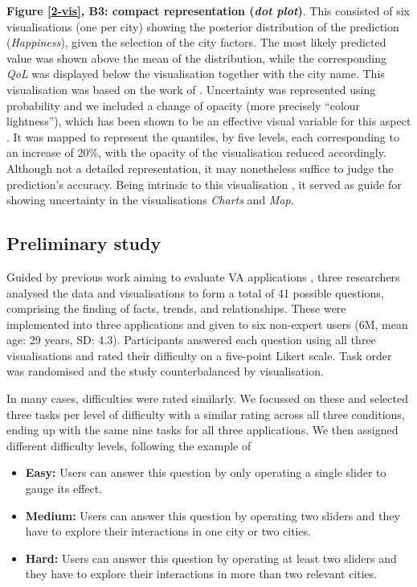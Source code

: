 \documentclass[final,5p,times,twocolumn,authoryear]{elsarticle}
\newcommand{\q}[1]{``#1''}
\begin{document}
\noindent \textbf{Figure  \ref{2-vis}, B3: compact representation (\emph{dot plot})}. This consisted of six visualisations (one per city) showing the posterior distribution of the prediction (\emph{Happiness}), given the selection of the city factors. The most likely predicted value was shown above the mean of the distribution, while the corresponding \emph{QoL} was displayed below the visualisation together with the city name. This visualisation was based on the work of  \cite{kay_when_2016}. Uncertainty was represented using probability and we included a change of opacity (more precisely \q{colour lightness}), which has been shown to be an effective visual variable for this aspect \citep{davis_modelling_1997}. It was mapped to represent the quantiles, by five levels, each corresponding to an increase of 20\%, with the opacity of the visualisation reduced accordingly. Although not a detailed representation, it may nonetheless suffice to judge the prediction's accuracy. Being intrinsic to this visualisation \citep{kay_when_2016}, it served as guide for showing uncertainty in the visualisations \emph{Charts} and \emph{Map}.




\subsection{Preliminary study} %
\label{sec:preliminary_study}
Guided by previous work aiming to evaluate VA applications \citep{laskowski_framework_2007,hearst_evaluating_2016}, three researchers analysed the data and visualisations to form a total of 41 possible questions, comprising the finding of facts, trends, and relationships. These were implemented into three applications and given to six non-expert users (6M, mean age: 29 years, SD: 4.3). Participants answered each question using all three visualisations and rated their difficulty on a five-point Likert scale. Task order was randomised and the study counterbalanced by visualisation.

In many cases, difficulties were rated similarly. We focussed on these and selected three tasks per level of difficulty with a similar rating across all three conditions, ending up with the same nine tasks for all three applications. We then assigned different difficulty levels, following the example of \cite{yang_understand_2014}

\begin{itemize}
  
  \item \textbf{Easy:} Users can answer this question by only operating a single slider to gauge its effect.
  \item \textbf{Medium:} Users can answer this question by operating two sliders and they have to explore their interactions in one city or two cities.
  \item \textbf{Hard:} Users can answer this question by operating at least two sliders and they have to explore their interactions in more than two relevant cities. 

\end{itemize}
\end{document}
